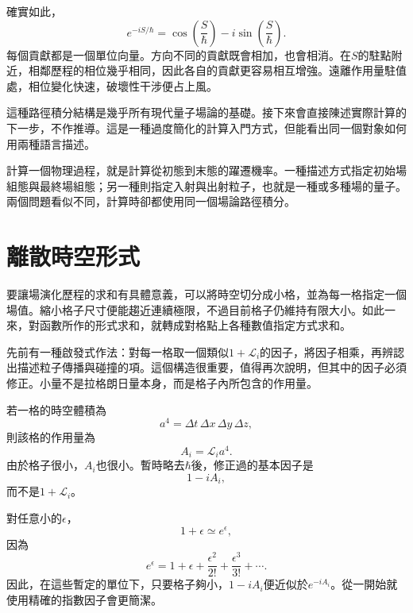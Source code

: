 確實如此，
\begin{equation}
e^{-iS/\hbar}
=
\cos\!\left(\frac{S}{\hbar}\right)
-i\sin\!\left(\frac{S}{\hbar}\right).
\end{equation}
每個貢獻都是一個單位向量。方向不同的貢獻既會相加，也會相消。在\(S\)的駐點附近，相鄰歷程的相位幾乎相同，因此各自的貢獻更容易相互增強。遠離作用量駐值處，相位變化快速，破壞性干涉便占上風。

這種路徑積分結構是幾乎所有現代量子場論的基礎。接下來會直接陳述實際計算的下一步，不作推導。這是一種過度簡化的計算入門方式，但能看出同一個對象如何用兩種語言描述。

計算一個物理過程，就是計算從初態到末態的躍遷機率。一種描述方式指定初始場組態與最終場組態；另一種則指定入射與出射粒子，也就是一種或多種場的量子。兩個問題看似不同，計算時卻都使用同一個場論路徑積分。

\section{離散時空形式}

要讓場演化歷程的求和有具體意義，可以將時空切分成小格，並為每一格指定一個場值。縮小格子尺寸便能趨近連續極限，不過目前格子仍維持有限大小。如此一來，對函數所作的形式求和，就轉成對格點上各種數值指定方式求和。

先前有一種啟發式作法：對每一格取一個類似\(1+\mathcal{L}_i\)的因子，將因子相乘，再辨認出描述粒子傳播與碰撞的項。這個構造很重要，值得再次說明，但其中的因子必須修正。小量不是拉格朗日量本身，而是格子內所包含的作用量。

若一格的時空體積為
\begin{equation}
a^4=\Delta t\,\Delta x\,\Delta y\,\Delta z,
\end{equation}
則該格的作用量為
\begin{equation}
A_i=\mathcal{L}_i a^4.
\end{equation}
由於格子很小，\(A_i\)也很小。暫時略去\(\hbar\)後，修正過的基本因子是
\begin{equation}
1-iA_i,
\end{equation}
而不是\(1+\mathcal{L}_i\)。

對任意小的\(\epsilon\)，
\begin{equation}
1+\epsilon\simeq e^\epsilon,
\end{equation}
因為
\begin{equation}
e^\epsilon
=1+\epsilon+\frac{\epsilon^2}{2!}
+\frac{\epsilon^3}{3!}+\cdots.
\end{equation}
因此，在這些暫定的單位下，只要格子夠小，\(1-iA_i\)便近似於\(e^{-iA_i}\)。從一開始就使用精確的指數因子會更簡潔。

